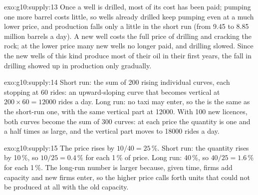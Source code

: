 \begin{solution}{exo:g10:supply:13}
Once a well is drilled, most of its cost has been paid; pumping one more barrel costs little, so wells already drilled keep pumping even at a much
lower price, and production falls only a little in the short run (from 9.45 to 8.85 million barrels a day). A new well costs the full price of
drilling and cracking the rock; at the lower price many new wells no longer paid, and drilling slowed. Since the new wells of this kind produce most
of their oil in their first years, the fall in drilling showed up in production only gradually.
\end{solution}

\begin{solution}{exo:g10:supply:14}
Short run: the sum of 200 rising individual curves, each stopping at 60 rides: an upward-sloping curve that becomes vertical at $200 \times 60 =
\num{12000}$ rides a day. Long run: no taxi may enter, so the  is the same as the short-run one, with the same vertical part at
\num{12000}. With 100 new licences, both curves become the sum of 300 curves: at each price the quantity is one and a half times as large, and the
vertical part moves to \num{18000} rides a day.
\end{solution}

\begin{solution}{exo:g10:supply:15}
The price rises by $10/40 = 25\,\%$. Short run: the quantity rises by 10\,\%, so $10/25 = 0.4\,\%$ for each 1\,\% of price. Long run: 40\,\%, so
$40/25 = 1.6\,\%$ for each 1\,\%. The long-run number is larger because, given time, firms add capacity and new firms enter, so the higher price calls
forth units that could not be produced at all with the old capacity.
\end{solution}

